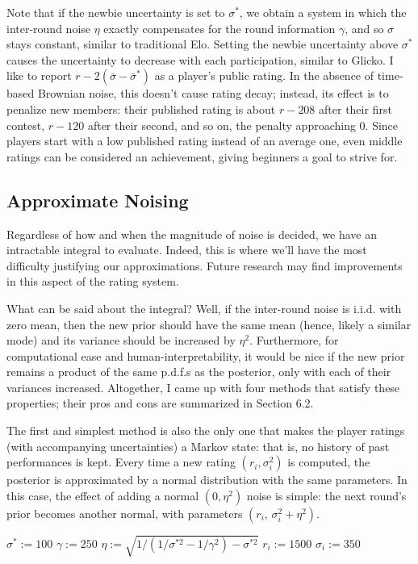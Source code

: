 \documentclass{article}
\begin{document}
Note that if the newbie uncertainty is set to $\sigma^*$, we obtain a system in which the inter-round noise $\eta$ exactly compensates for the round information $\gamma$, and so $\sigma$ stays constant, similar to traditional Elo. Setting the newbie uncertainty above $\sigma^*$ causes the uncertainty to decrease with each participation, similar to Glicko. I like to report $r-2(\bar\sigma-\bar\sigma^*)$ as a player's public rating. In the absence of time-based Brownian noise, this doesn't cause rating decay; instead, its effect is to penalize new members: their published rating is about $r - 208$ after their first contest, $r - 120$ after their second, and so on, the penalty approaching $0$. Since players start with a low published rating instead of an average one, even middle ratings can be considered an achievement, giving beginners a goal to strive for. 

\subsection{Approximate Noising}

Regardless of how and when the magnitude of noise is decided, we have an intractable integral to evaluate. Indeed, this is where we'll have the most difficulty justifying our approximations. Future research may find improvements in this aspect of the rating system.

What can be said about the integral? Well, if the inter-round noise is i.i.d. with zero mean, then the new prior should have the same mean (hence, likely a similar mode) and its variance should be increased by $\eta^2$. Furthermore, for computational ease and human-interpretability, it would be nice if the new prior remains a product of the same p.d.f.s as the posterior, only with each of their variances increased. Altogether, I came up with four methods that satisfy these properties; their pros and cons are summarized in Section 6.2.

The first and simplest method is also the only one that makes the player ratings (with accompanying uncertainties) a Markov state: that is, no history of past performances is kept. Every time a new rating $(r_i,\sigma_i^2)$ is computed, the posterior is approximated by a normal distribution with the same parameters. In this case, the effect of adding a normal $(0,\eta^2)$ noise is simple: the next round's prior becomes another normal, with parameters $(r_i,\,\sigma_i^2+\eta^2)$.

\begin{algorithm}
	\caption{$init()$}
	\label{alg:init}
	\begin{algorithmic}
		\STATE $\sigma^* := 100$
		\STATE $\gamma := 250$
		\STATE $\eta := \sqrt{1 / \left( 1/\sigma^{*2} - 1/\gamma^2 \right) - \sigma^{*2}}$
		\STATE $r_i := 1500$
		\STATE $\sigma_i := 350$
		\ENDFOR
	\end{algorithmic}
\end{algorithm}
\end{document}
